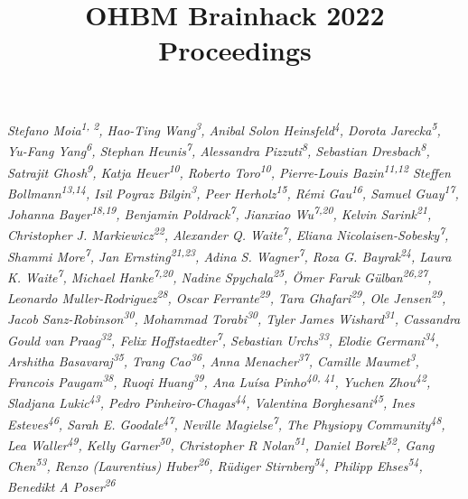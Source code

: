 \documentclass[10pt,a4paper,twocolumns]{proc}
\title{OHBM Brainhack 2022 Proceedings}
\newcommand{\authors}[1]{\emph{\footnotesize #1} \\}
\begin{document}
\maketitle

\authors{Stefano Moia\textsuperscript{1, 2}, %
Hao-Ting Wang\textsuperscript{3}, %
Anibal Solon Heinsfeld\textsuperscript{4}, %
Dorota Jarecka\textsuperscript{5}, %
Yu-Fang Yang\textsuperscript{6}, %
Stephan Heunis\textsuperscript{7}, %
Alessandra Pizzuti\textsuperscript{8}, %
Sebastian Dresbach\textsuperscript{8}, %
Satrajit Ghosh\textsuperscript{9}, %
Katja Heuer\textsuperscript{10}, %
Roberto Toro\textsuperscript{10}, %
Pierre-Louis Bazin\textsuperscript{11,12} %
Steffen Bollmann\textsuperscript{13,14}, %
Isil Poyraz Bilgin\textsuperscript{3}, %
Peer Herholz\textsuperscript{15}, %
Rémi Gau\textsuperscript{16}, %
Samuel Guay\textsuperscript{17}, %
Johanna Bayer\textsuperscript{18,19}, %
Benjamin Poldrack\textsuperscript{7}, %
Jianxiao Wu\textsuperscript{7,20}, %
Kelvin Sarink\textsuperscript{21}, %
Christopher J. Markiewicz\textsuperscript{22}, %
Alexander Q. Waite\textsuperscript{7}, %
Eliana Nicolaisen-Sobesky\textsuperscript{7}, %
Shammi More\textsuperscript{7}, %
Jan Ernsting\textsuperscript{21,23}, %
Adina S. Wagner\textsuperscript{7}, %
Roza G. Bayrak\textsuperscript{24}, %
Laura K. Waite\textsuperscript{7}, %
Michael Hanke\textsuperscript{7,20}, %
Nadine Spychala\textsuperscript{25}, %
\"Omer Faruk G\"ulban\textsuperscript{26,27}, %
Leonardo Muller-Rodriguez\textsuperscript{28}, %
Oscar Ferrante\textsuperscript{29}, %
Tara Ghafari\textsuperscript{29}, %
Ole Jensen\textsuperscript{29}, %
Jacob Sanz-Robinson\textsuperscript{30}, %
Mohammad Torabi\textsuperscript{30}, %
Tyler James Wishard\textsuperscript{31}, %
Cassandra Gould van Praag\textsuperscript{32}, %
Felix Hoffstaedter\textsuperscript{7}, %
Sebastian Urchs\textsuperscript{33}, %
Elodie Germani\textsuperscript{34}, %
Arshitha Basavaraj\textsuperscript{35}, %
Trang Cao\textsuperscript{36}, %
Anna Menacher\textsuperscript{37}, %
Camille Maumet\textsuperscript{3}, %
Francois Paugam\textsuperscript{38}, %
Ruoqi Huang\textsuperscript{39}, %
Ana Luísa Pinho\textsuperscript{40, 41}, %
Yuchen Zhou\textsuperscript{42}, %
Sladjana Lukic\textsuperscript{43}, %
Pedro Pinheiro-Chagas\textsuperscript{44}, %
Valentina Borghesani\textsuperscript{45}, %
Ines Esteves\textsuperscript{46}, %
Sarah E. Goodale\textsuperscript{47}, %
Neville Magielse\textsuperscript{7}, %
The Physiopy Community\textsuperscript{48}, %
Lea Waller\textsuperscript{49}, %
Kelly Garner\textsuperscript{50}, %
Christopher R Nolan\textsuperscript{51}, %
Daniel Borek\textsuperscript{52}, %
Gang Chen\textsuperscript{53}, %
Renzo (Laurentius) Huber\textsuperscript{26}, %
R\"udiger Stirnberg\textsuperscript{54}, %
Philipp Ehses\textsuperscript{54}, %
Benedikt A Poser\textsuperscript{26}
}
\end{document}
